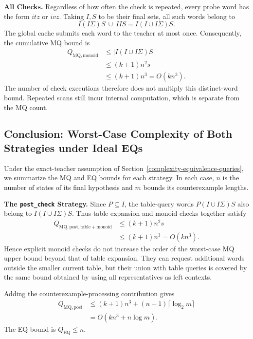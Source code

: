 \documentclass{ieice-tecrep}
\begin{document}
\textbf{All Checks.}
Regardless of how often the check is repeated, every probe word has
the form \(itz\) or \(ivz\). Taking \(I,S\) to be their final sets,
all such words belong to
\[
I(I\Sigma)S\ \cup\ IIS=I(I\cup I\Sigma)S.
\]
The global cache submits each word to the teacher at most once.
Consequently, the cumulative MQ bound is
\[
\begin{aligned}
Q_{\mathrm{MQ},\mathrm{monoid}}
&\le |I(I\cup I\Sigma)S|\\
&\le(k+1)n^2s\\
&\le(k+1)n^3=O(kn^3).
\end{aligned}
\]
The number of check executions therefore does not multiply this
distinct-word bound. Repeated scans still incur internal computation,
which is separate from the MQ count.

\subsection{Conclusion: Worst-Case Complexity of Both Strategies under Ideal EQs}\label{complexity-query-conclusion}

Under the exact-teacher assumption of
Section~\ref{complexity-equivalence-queries}, we summarize the MQ and
EQ bounds for each strategy. In each case, \(n\) is the number of
states of its final hypothesis and \(m\) bounds its counterexample
lengths.

\textbf{The \texttt{post\_check} Strategy.}
Since \(P\subseteq I\), the table-query words \(P(I\cup I\Sigma)S\)
also belong to \(I(I\cup I\Sigma)S\). Thus table expansion and
monoid checks together satisfy
\[
\begin{aligned}
Q_{\mathrm{MQ},\mathrm{post},\mathrm{table+monoid}}
&\le(k+1)n^2s\\
&\le(k+1)n^3=O(kn^3).
\end{aligned}
\]
Hence explicit monoid checks do not increase the order of the
worst-case MQ upper bound beyond that of table expansion. They can
request additional words outside the smaller current table, but
their union with table queries is covered by the same bound obtained
by using all representatives as left contexts.

Adding the counterexample-processing contribution gives
\[
\begin{aligned}
Q_{\mathrm{MQ},\mathrm{post}}
&\le(k+1)n^3+(n-1)\lceil\log_2m\rceil\\
&=O(kn^3+n\log m).
\end{aligned}
\]
The EQ bound is \(Q_{\mathrm{EQ}}\le n\).
\end{document}
